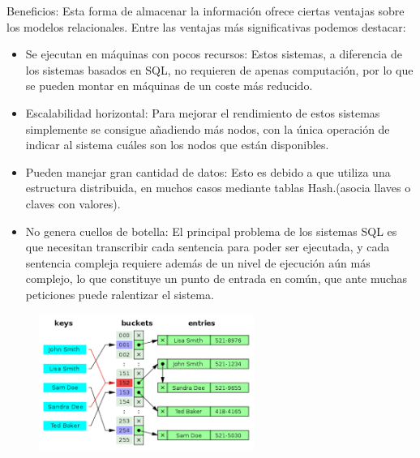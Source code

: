 \documentclass[%
 reprint,
 amsmath,amssymb,
 aps,
]{revtex4-1}
\begin{document}
\par Beneficios:
	Esta forma de almacenar la información ofrece ciertas ventajas sobre los modelos relacionales. Entre las ventajas más significativas podemos destacar:
	\begin{itemize}
		\item Se ejecutan en máquinas con pocos recursos: Estos sistemas, a diferencia de los sistemas basados en SQL, no requieren de apenas computación, por lo que se pueden montar en máquinas de un coste más reducido.
		\item Escalabilidad horizontal: Para mejorar el rendimiento de estos sistemas simplemente se consigue añadiendo más nodos, con la única operación de indicar al sistema cuáles son los nodos que están disponibles.
		\item Pueden manejar gran cantidad de datos: Esto es debido a que utiliza una estructura distribuida, en muchos casos mediante tablas Hash.(asocia llaves o claves con valores).\cite{hash}
		\item No genera cuellos de botella: El principal problema de los sistemas SQL es que necesitan transcribir cada sentencia para poder ser ejecutada, y cada sentencia compleja requiere además de un nivel de ejecución aún más complejo, lo que constituye un punto de entrada en común, que ante muchas peticiones puede ralentizar el sistema. \cite{acens}
	\end{itemize}
	\begin{figure}[htb]
	\begin{center}
	\includegraphics[width=7cm]{./Imagenes/hash}
	\end{center}
	\end{figure}
\end{document}
